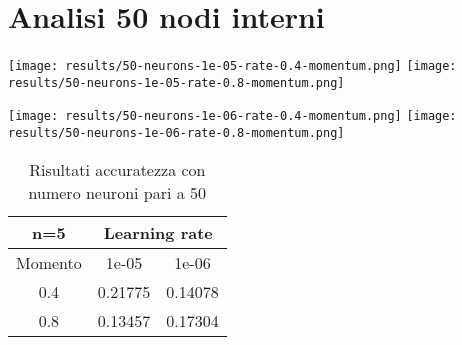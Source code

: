 \section{Analisi 50 nodi interni}
\begin{center}
\texttt{[image: results/50-neurons-1e-05-rate-0.4-momentum.png]}
\texttt{[image: results/50-neurons-1e-05-rate-0.8-momentum.png]}
\end{center}

\begin{center}
\texttt{[image: results/50-neurons-1e-06-rate-0.4-momentum.png]}
\texttt{[image: results/50-neurons-1e-06-rate-0.8-momentum.png]}
\end{center}
\begin{table}[htbp]
    \centering
    \begin{tabular}{|c|c|c|}
    \hline
    n=5 & \multicolumn{2}{c|}{Learning rate} \\
    \hline
    Momento & 1e-05 & 1e-06 \\
    \hline
    0.4 & 0.21775 & 0.14078 \\
    \hline
    0.8 & 0.13457 & 0.17304 \\
    \hline
    \end{tabular}
    \caption{Risultati accuratezza con numero neuroni pari a 50}
\end{table}

{\clearpage}
